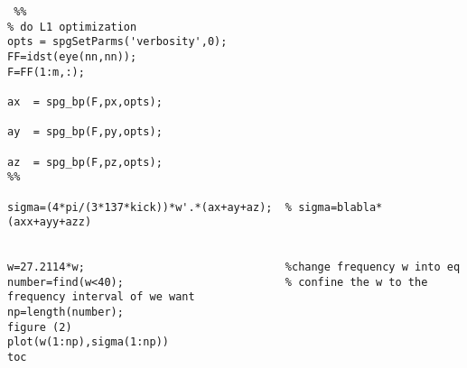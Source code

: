 \documentclass[11pt]{article}
\begin{document}
\begin{appendices}
\begin{verbatim}
 %% 
% do L1 optimization
opts = spgSetParms('verbosity',0); 
FF=idst(eye(nn,nn));
F=FF(1:m,:);
 
ax  = spg_bp(F,px,opts); 

ay  = spg_bp(F,py,opts); 

az  = spg_bp(F,pz,opts); 
%%
 
sigma=(4*pi/(3*137*kick))*w'.*(ax+ay+az);  % sigma=blabla*(axx+ayy+azz)

 
w=27.2114*w;                               %change frequency w into eq
number=find(w<40);                         % confine the w to the frequency interval of we want
np=length(number);                         
figure (2)
plot(w(1:np),sigma(1:np))
toc
\end{verbatim}



\end{appendices}
\end{document}

